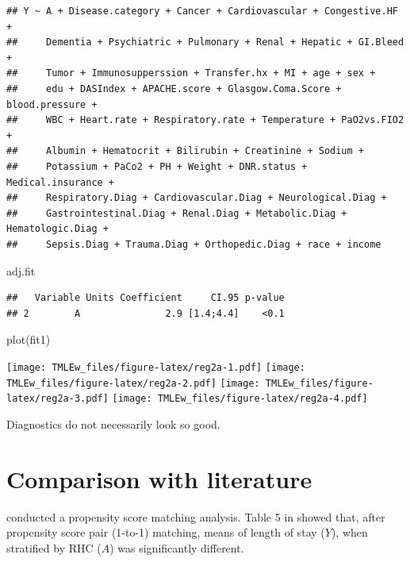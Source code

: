\documentclass[
]{book}
\newenvironment{Shaded}{\begin{snugshade}}{\end{snugshade}}
\newcommand{\FunctionTok}[1]{\textcolor[rgb]{0.00,0.00,0.00}{#1}}
\newcommand{\NormalTok}[1]{#1}
\begin{document}
\begin{verbatim}
## Y ~ A + Disease.category + Cancer + Cardiovascular + Congestive.HF + 
##     Dementia + Psychiatric + Pulmonary + Renal + Hepatic + GI.Bleed + 
##     Tumor + Immunosupperssion + Transfer.hx + MI + age + sex + 
##     edu + DASIndex + APACHE.score + Glasgow.Coma.Score + blood.pressure + 
##     WBC + Heart.rate + Respiratory.rate + Temperature + PaO2vs.FIO2 + 
##     Albumin + Hematocrit + Bilirubin + Creatinine + Sodium + 
##     Potassium + PaCo2 + PH + Weight + DNR.status + Medical.insurance + 
##     Respiratory.Diag + Cardiovascular.Diag + Neurological.Diag + 
##     Gastrointestinal.Diag + Renal.Diag + Metabolic.Diag + Hematologic.Diag + 
##     Sepsis.Diag + Trauma.Diag + Orthopedic.Diag + race + income
\end{verbatim}

\begin{Shaded}
\begin{Highlighting}[]
\NormalTok{adj.fit }
\end{Highlighting}
\end{Shaded}

\begin{verbatim}
##   Variable Units Coefficient     CI.95 p-value
## 2        A               2.9 [1.4;4.4]    <0.1
\end{verbatim}

\begin{Shaded}
\begin{Highlighting}[]
\FunctionTok{plot}\NormalTok{(fit1)}
\end{Highlighting}
\end{Shaded}

\texttt{[image: TMLEw\_files/figure-latex/reg2a-1.pdf]} \texttt{[image: TMLEw\_files/figure-latex/reg2a-2.pdf]} \texttt{[image: TMLEw\_files/figure-latex/reg2a-3.pdf]} \texttt{[image: TMLEw\_files/figure-latex/reg2a-4.pdf]}

Diagnostics do not necessarily look so good.

\hypertarget{comparison-with-literature}{%
\section{Comparison with literature}\label{comparison-with-literature}}

\citet{connors1996effectiveness} conducted a propensity score matching analysis. Table 5 in \citet{connors1996effectiveness} showed that, after propensity score pair (1-to-1) matching, means of length of stay (\(Y\)), when stratified by RHC (\(A\)) was significantly different.
\end{document}
